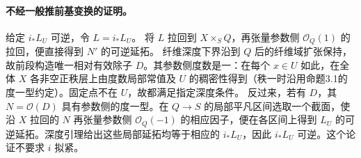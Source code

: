 \documentclass[openany,fontset=fandol]{ctexbook}
\newcommand{\OO}{\mathcal O}
\begin{document}
\paragraph{不经一般推前基变换的证明。}
给定 \(i_*L_U\) 可逆，令 \(L=i_*L_U\)。
将 \(L\) 拉回到 \(X\times_S Q\)，再张量参数侧 \(\OO_Q(1)\) 的拉回，便直接得到 \(N'\) 的可逆延拓。
纤维深度下界沿到 \(Q\) 后的纤维域扩张保持，故前段构造唯一相对有效除子 \(D\)。其参数侧度数是一：在每个 \(x\in U\) 如此，在全体 \(X\) 各非空正秩层上由度数局部常值及 \(U\) 的稠密性得到（秩一时沿用命题3.1的度一型约定）。固定点不在 \(U\)，故都满足指定深度条件。
反过来，若有 \(D\)，其 \(N=\OO(D)\) 具有参数侧的度一型。在 \(Q\to S\) 的局部平凡区间选取一个截面，使沿 \(X\) 拉回的 \(N\) 再张量参数侧 \(\OO_Q(-1)\) 的相应因子，便在各区间上得到 \(L_U\) 的可逆延拓。深度引理给出这些局部延拓均等于相应的 \(i_*L_U\)，因此 \(i_*L_U\) 可逆。这个论证不要求 \(i\) 拟紧。
\end{document}
